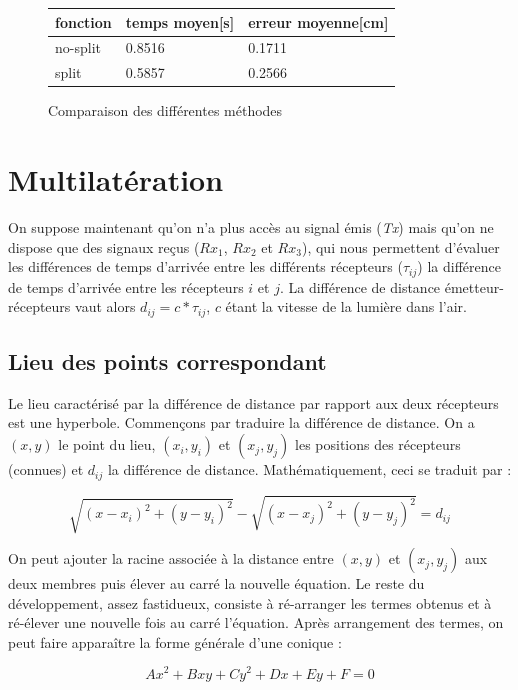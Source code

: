 \documentclass[10pt,a4paper]{article}
\begin{document}
			\begin{figure}
				\centering
				\begin{tabular}{|l|l|l|}
					\hline
					fonction & temps moyen[s] & erreur moyenne[cm] \\
					\hline
					no-split & 0.8516 & 0.1711 \\
					split & 0.5857 & 0.2566 \\
					\hline
				\end{tabular}
				\caption{Comparaison des différentes méthodes}
			\end{figure}
			
			
			
\section{Multilatération}
On suppose maintenant qu'on n'a plus accès au signal émis (\textit{Tx}) mais qu'on ne dispose que des signaux reçus ($Rx_1$, $Rx_2$ et $Rx_3$), qui nous permettent d'évaluer les différences de temps d'arrivée entre les différents récepteurs ($\tau_{ij}$) la différence de temps d'arrivée entre les récepteurs $i$ et $j$. La différence de distance émetteur-récepteurs vaut alors $d_{ij} = c*\tau_{ij}$, $c$ étant la vitesse de la lumière dans l'air.

\subsection{Lieu des points correspondant}
Le lieu caractérisé par la différence de distance par rapport aux deux récepteurs est une hyperbole. Commençons par traduire la différence de distance. On a $(x,y)$ le point du lieu, $(x_i,y_i)$ et $(x_j,y_j)$ les positions des récepteurs (connues) et $d_{ij}$ la différence de distance. Mathématiquement, ceci se traduit par :

\begin{equation}
\sqrt{(x-x_i)^2 + (y-y_i)^2} - \sqrt{(x-x_j)^2 + (y-y_j)^2} = d_{ij}
\label{Hyperbole}
\end{equation}

On peut ajouter la racine associée à la distance entre $(x,y)$ et $(x_j,y_j)$ aux deux membres puis élever au carré la nouvelle équation. Le reste du développement, assez fastidueux, consiste à ré-arranger les termes obtenus et à ré-élever une nouvelle fois au carré l'équation. Après arrangement des termes, on peut faire apparaître la forme générale d'une conique :

\begin{equation}
Ax^2 + Bxy + Cy^2 + Dx + Ey + F = 0
\end{equation}
\end{document}
